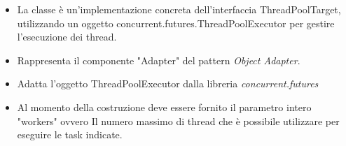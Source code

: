 \begin{itemize}
\begin{itemize}
        \begin{itemize}
            \item La classe è un'implementazione concreta dell'interfaccia ThreadPoolTarget, utilizzando un oggetto concurrent.futures.ThreadPoolExecutor per gestire l'esecuzione dei thread.
            \item Rappresenta il componente "Adapter" del pattern \textit{Object Adapter}.
            \item Adatta l'oggetto ThreadPoolExecutor dalla libreria \textit{concurrent.futures}
            \item Al momento della costruzione deve essere fornito il parametro intero "workers" ovvero
            Il numero massimo di thread che è possibile utilizzare per eseguire le task indicate.
        \end{itemize}
    \end{itemize}




\end{itemize}


